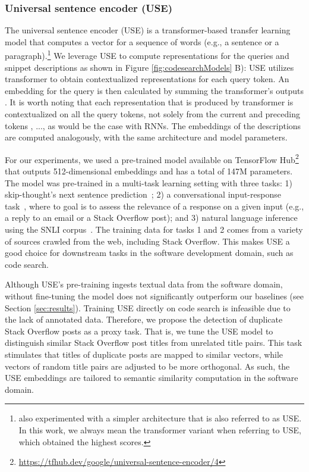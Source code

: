 \documentclass[12pt,conference, onecolumn]{IEEEtran}
\begin{document}
\subsubsection*{Universal sentence encoder (USE)}
The universal sentence encoder (USE) is a transformer-based transfer learning model that computes a vector for a sequence of words (e.g., a sentence or a paragraph).\footnote{\citet{cer2018universal} also experimented with a simpler architecture that is also referred to as USE. In this work, we always mean the transformer variant when referring to USE, which obtained the highest scores.} We leverage USE to compute representations for the queries and snippet descriptions as shown in Figure \ref{fig:codesearchModels} B): USE utilizes transformer to obtain contextualized representations  for each query token. An embedding for the query is then calculated by summing the transformer's outputs . It is worth noting that each representation  that is produced by transformer is contextualized on all the query tokens, not solely from the current and preceding tokens , ...,  as would be the case with RNNs. The embeddings of the descriptions are computed analogously, with the same architecture and model parameters.

For our experiments, we used a pre-trained model available on TensorFlow Hub\footnote{\url{https://tfhub.dev/google/universal-sentence-encoder/4}} that outputs 512-dimensional embeddings and has a total of 147M parameters.  The model was pre-trained in a multi-task learning setting with three tasks: 1) skip-thought's next sentence prediction~\cite{kiros2015skip}; 2) a conversational input-response task~\cite{henderson2017efficient}, where to goal is to assess the relevance of a response on a given input (e.g., a reply to an email or a Stack Overflow post); and 3) natural language inference using the SNLI corpus~\cite{snli:emnlp2015}. The training data for tasks 1 and 2 comes from a variety of sources crawled from the web, including Stack Overflow. This makes USE a good choice for downstream tasks in the software development domain, such as code search.

Although USE's pre-training ingests textual data from the software domain, without fine-tuning the model does not significantly outperform our baselines (see Section \ref{sec:results}). Training USE directly on code search is infeasible due to the lack of annotated data. Therefore, we propose the detection of duplicate Stack Overflow posts as a proxy task. That is, we tune the USE model to distinguish similar Stack Overflow post titles from unrelated title pairs. This task stimulates that titles of duplicate posts are mapped to similar vectors, while vectors of random title pairs are adjusted to be more orthogonal. As such, the USE embeddings are tailored to semantic similarity computation in the software domain.
\end{document}

